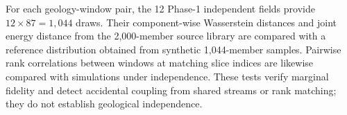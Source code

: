 
For each geology-window pair, the 12 Phase-1 independent fields provide
$12\times87=1{,}044$ draws. Their component-wise Wasserstein distances and
joint energy distance from the 2,000-member source library are compared with a
reference distribution obtained from synthetic 1,044-member samples. Pairwise
rank correlations between windows at matching slice indices are likewise
compared with simulations under independence. These tests verify marginal
fidelity and detect accidental coupling from shared streams or rank matching;
they do not establish geological independence. 
